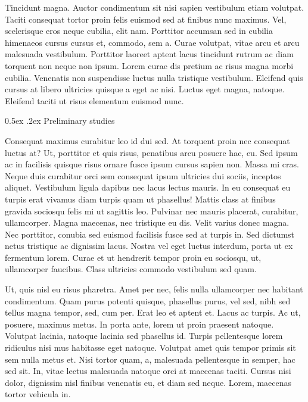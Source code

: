 \documentclass[11pt,]{article}
\makeatletter
\renewcommand\subsubsection{
  \@startsection{subsubsection}{3}{\z@}
    {-1.0ex\@plus -1ex \@minus -.2ex}%
    {0.5ex \@plus .2ex}%
    {\normalfont\normalsize\bf}} %
\makeatother
\begin{document}
Tincidunt magna. Auctor condimentum sit nisi sapien vestibulum etiam
volutpat. Taciti consequat tortor proin felis euismod sed at finibus
nunc maximus. Vel, scelerisque eros neque cubilia, elit nam. Porttitor
accumsan sed in cubilia himenaeos cursus cursus et, commodo, sem a.
Curae volutpat, vitae arcu et arcu malesuada vestibulum. Porttitor
laoreet aptent lacus tincidunt rutrum ac diam torquent non neque non
ipsum. Lorem curae dis pretium ac risus magna morbi cubilia. Venenatis
non suspendisse luctus nulla tristique vestibulum. Eleifend quis cursus
at libero ultricies quisque a eget ac nisi. Luctus eget magna, natoque.
Eleifend taciti ut risus elementum euismod nunc.

\hypertarget{preliminary-studies}{%
\subsubsection{Preliminary studies}\label{preliminary-studies}}

Consequat maximus curabitur leo id dui sed. At torquent proin nec
consequat luctus at? Ut, porttitor et quis risus, penatibus arcu posuere
hac, eu. Sed ipsum ac in facilisis quisque risus ornare fusce ipsum
cursus sapien non. Massa mi cras. Neque duis curabitur orci sem
consequat ipsum ultricies dui sociis, inceptos aliquet. Vestibulum
ligula dapibus nec lacus lectus mauris. In eu consequat eu turpis erat
vivamus diam turpis quam ut phasellus! Mattis class at finibus gravida
sociosqu felis mi ut sagittis leo. Pulvinar nec mauris placerat,
curabitur, ullamcorper. Magna maecenas, nec tristique eu dis. Velit
varius donec magna. Nec porttitor, conubia sed euismod facilisis fusce
sed at turpis in. Sed dictumst netus tristique ac dignissim lacus.
Nostra vel eget luctus interdum, porta ut ex fermentum lorem. Curae et
ut hendrerit tempor proin eu sociosqu, ut, ullamcorper faucibus. Class
ultricies commodo vestibulum sed quam.

Ut, quis nisl eu risus pharetra. Amet per nec, felis nulla ullamcorper
nec habitant condimentum. Quam purus potenti quisque, phasellus purus,
vel sed, nibh sed tellus magna tempor, sed, cum per. Erat leo et aptent
et. Lacus ac turpis. Ac ut, posuere, maximus metus. In porta ante, lorem
ut proin praesent natoque. Volutpat lacinia, natoque lacinia sed
phasellus id. Turpis pellentesque lorem ridiculus nisi mus habitasse
eget natoque. Volutpat amet quis tempor primis sit sem nulla metus et.
Nisi tortor quam, a, malesuada pellentesque in semper, hac sed sit. In,
vitae lectus malesuada natoque orci at maecenas taciti. Cursus nisi
dolor, dignissim nisl finibus venenatis eu, et diam sed neque. Lorem,
maecenas tortor vehicula in.
\end{document}
